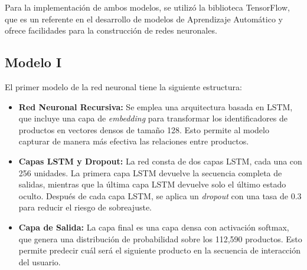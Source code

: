 \documentclass[runningheads]{llncs}
\begin{document}
	Para la implementación de ambos modelos, se utilizó la biblioteca TensorFlow, que es un referente en el desarrollo de modelos de Aprendizaje Automático y ofrece facilidades para la construcción de redes neuronales.
	
	\subsection{Modelo I}
	El primer modelo de la red neuronal tiene la siguiente estructura:
	\begin{itemize}
	    \item \textbf{Red Neuronal Recursiva:} Se emplea una arquitectura basada en LSTM, que incluye una capa de \textit{embedding} para transformar los identificadores de productos en vectores densos de tamaño 128. Esto permite al modelo capturar de manera más efectiva las relaciones entre productos.
	    
	    \item \textbf{Capas LSTM y Dropout:} La red consta de dos capas LSTM, cada una con 256 unidades. La primera capa LSTM devuelve la secuencia completa de salidas, mientras que la última capa LSTM devuelve solo el último estado oculto. Después de cada capa LSTM, se aplica un \textit{dropout} con una tasa de $0.3$ para reducir el riesgo de sobreajuste.
	    
	    \item \textbf{Capa de Salida:} La capa final es una capa densa con activación softmax, que genera una distribución de probabilidad sobre los 112,590 productos. Esto permite predecir cuál será el siguiente producto en la secuencia de interacción del usuario.
	\end{itemize}
\end{document}
